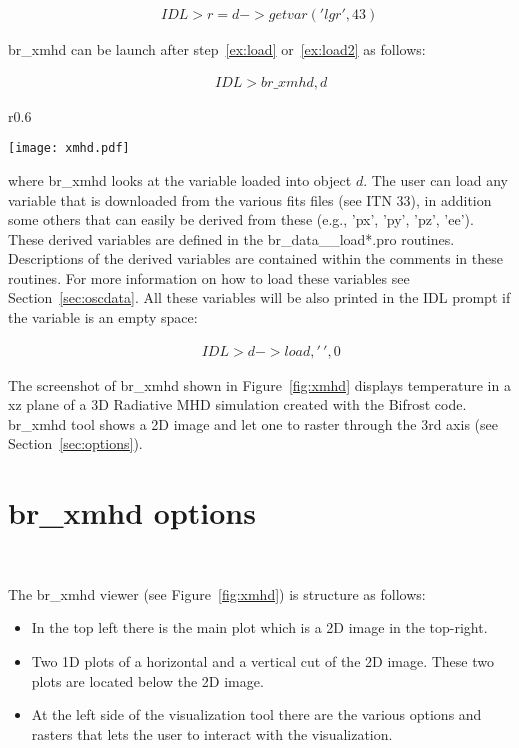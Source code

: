 \documentclass[12pt,preprint]{aastex}
\begin{document}
\begin{eqnarray}
&& IDL> r=d->getvar('lgr',43) ~\label{ex:load2}
\end{eqnarray}

br\_xmhd can be launch after step~\ref{ex:load} or~\ref{ex:load2} as follows:

\begin{eqnarray}
&& IDL> br\_xmhd,d 
\end{eqnarray}

\clearpage 

\begin{wrapfigure}{r}{0.6\textwidth}
\begin{center}
	\texttt{[image: xmhd.pdf]}
\end{center}
\caption{\label{fig:xmhd} Screenshot of the br\_xmhd GUI visualization tool.}
\end{wrapfigure}

where br\_xmhd looks at the variable loaded into object $d$. The user can load any variable 
that is downloaded from the various fits files (see ITN 33), in addition some others that can easily 
be derived from these (e.g., 'px', 'py', 'pz', 'ee'). These derived variables 
are defined in the br\_data\_\_load*.pro routines. Descriptions of the derived variables 
are contained within the comments in these routines. For more information on how to load 
these variables see Section~\ref{sec:oscdata}. All 
these variables will be also printed in the IDL prompt if the variable is an empty space:

 \begin{eqnarray}
&& IDL>d-> load,'\, ',0
\end{eqnarray}

The screenshot of br\_xmhd shown in Figure~\ref{fig:xmhd} displays temperature in a xz 
plane of a 3D Radiative MHD simulation created with the Bifrost code. 
br\_xmhd tool shows a 2D image and let one to raster through the 3rd axis (see Section~\ref{sec:options}).

\section{br\_xmhd options}~\label{sec:options}

The br\_xmhd viewer (see Figure~\ref{fig:xmhd}) is structure as follows:

\begin{itemize}
\item In the top left there is the main plot which is a 2D image in the top-right. 
\item Two 1D plots of a horizontal and a vertical cut of the 2D image. These two plots are located 
below the 2D image.
\item At the left side of the visualization tool there are the various options and rasters that 
lets the user to interact with the visualization. 
\end{itemize}
\end{document}
